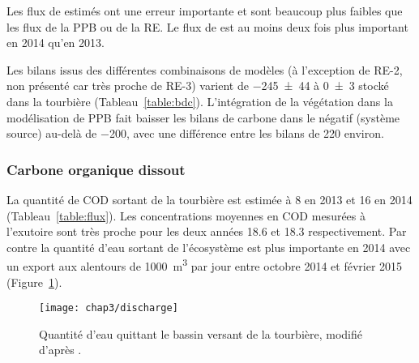 Les flux de \chh estimés ont une erreur importante et sont beaucoup plus faibles que les flux de la PPB ou de la RE.
Le flux de \chh est au moins deux fois plus important en 2014 qu'en 2013.

Les bilans issus des différentes combinaisons de modèles (à l'exception de RE-2, non présenté car très proche de RE-3) varient de \SI{-245(44)}{\gcma} à \SI{0(3)}{\gcma} stocké dans la tourbière (Tableau~\ref{table:bdc}).
L'intégration de la végétation dans la modélisation de PPB fait baisser les bilans de carbone dans le négatif (système source) au-delà de \SI{-200}{\gcma}, avec une différence entre les bilans de \SI{220}{\gcma} environ.




\subsubsection{Carbone organique dissout}

La quantité de COD sortant de la tourbière est estimée à \SI{8}{\gcma} en 2013 et \SI{16}{\gcma} en 2014 (Tableau~\ref{table:flux}).
Les concentrations moyennes en COD mesurées à l'exutoire sont très proche pour les deux années \num{18.6} et \SI{18.3}{\mgl} respectivement.
Par contre la quantité d'eau sortant de l'écosystème est plus importante en 2014 avec un export aux alentours de \SI{1000}{\cubic\metre} par jour entre octobre 2014 et février 2015 (Figure~\ref{fig:discharge}).

\begin{figure}
\centering
\texttt{[image: chap3/discharge]}
\caption{Quantité d'eau quittant le bassin versant de la tourbière, modifié d'après \citet{binet2013}.}
\label{fig:discharge}
\end{figure}


